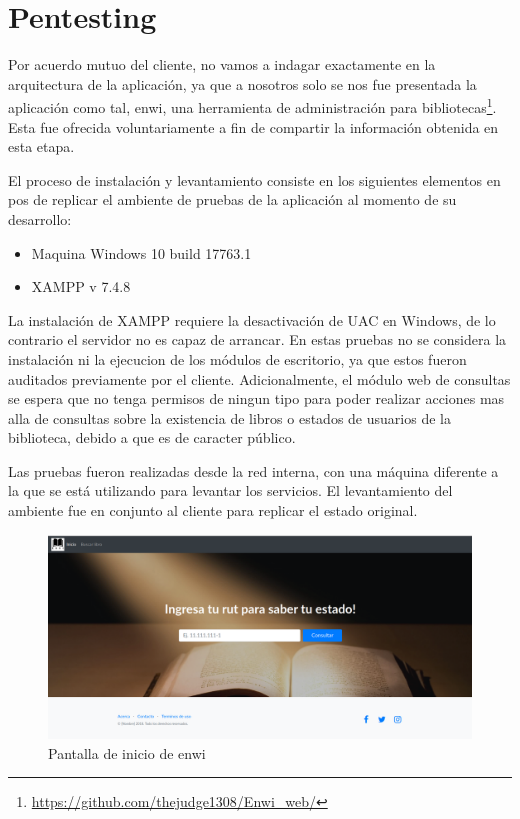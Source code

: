 \section{Pentesting}
Por acuerdo mutuo del cliente, no vamos a indagar exactamente en la arquitectura de la aplicación, ya que a nosotros solo se nos fue presentada la aplicación como tal, enwi, una herramienta de administración para bibliotecas\footnote{\url{https://github.com/thejudge1308/Enwi_web/}}. Esta fue ofrecida voluntariamente a fin de compartir la información obtenida en esta etapa.

El proceso de instalación y levantamiento consiste en los siguientes elementos en pos de replicar el ambiente de pruebas de la aplicación al momento de su desarrollo:

\begin{itemize}
    \item Maquina Windows 10 build 17763.1
    \item XAMPP v 7.4.8
\end{itemize}

La instalación de XAMPP requiere la desactivación de UAC en Windows, de lo contrario el servidor no es capaz de arrancar.  En estas pruebas no se considera la instalación ni la ejecucion de los módulos de escritorio, ya que estos fueron auditados previamente por el cliente. Adicionalmente, el módulo web de consultas se espera que no tenga permisos de ningun tipo para poder realizar acciones mas alla de consultas sobre la existencia de libros o estados de usuarios de la biblioteca, debido a que es de caracter público.

Las pruebas fueron realizadas desde la red interna, con una máquina diferente a la que se está utilizando para levantar los servicios. El levantamiento del ambiente fue en conjunto al cliente para replicar el estado original.

\begin{figure}
	\centering
	\includegraphics[width=.9\textwidth]{fragments/pentest/app1.png}
    \caption{ Pantalla de inicio de enwi }
\end{figure}

